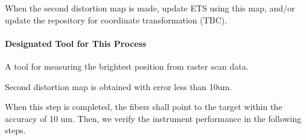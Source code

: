 When the second distortion map is made, update ETS using this map, and/or update the repository for coordinate transformation (TBC).

\paragraph{Designated Tool for This Process}
A tool for measuring the brightest position from raster scan data.

\begin{itembox}[l]{}
Second distortion map is obtained with error less than 10um.

\end{itembox}

When this step is completed, the fibers shall point to the target within the accuracy of 10 um.
Then, we verify the instrument performance in the following steps. 